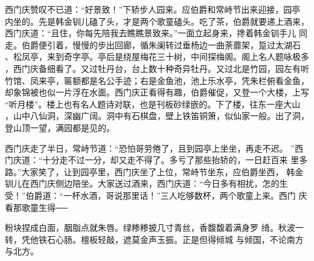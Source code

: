 西门庆赞叹不已道：“好景致！”下轿步人园来。应伯爵和常峙节出来迎接，园亭
内坐的。先是韩金钏儿磕了头，才是两个歌童磕头。吃了茶，伯爵就要递上酒来，
西门庆道：“且住，你每先陪我去瞧瞧景致来。”一面立起身来，搀着韩金钏手儿
同走。伯爵便引着，慢慢的步出回廊，循朱阑转过垂杨边一曲荼蘼架，踅过太湖石
、松凤亭，来到奇字亭。亭后是绕屋梅花三十树，中间探梅阁。阁上名人题咏极多
，西门庆备细看了。又过牡丹台，台上数十种奇异牡丹。又过北是竹园，园左有听
竹馆、凤来亭，匾额都是名公手迹；右是金鱼池，池上乐水亭，凭朱栏俯看金鱼，
却象锦被也似一片浮在水面。西门庆正看得有趣，伯爵催促，又登一个大楼，上写
“听月楼”。楼上也有名人题诗对联，也是刊板砂绿嵌的。下了楼，往东一座大山
，山中八仙洞，深幽广阔。洞中有石棋盘，壁上铁笛铜箫，似仙家一般。出了洞，
登山顶一望，满园都是见的。

西门庆走了半日，常峙节道：“恐怕哥劳倦了，且到园亭上坐坐，再走不迟。
”西门庆道：“十分走不过一分，却又走不得了。多亏了那些抬轿的，一日赶百来
里多路。”大家笑了，让到园亭里，西门庆坐了上位，常峙节坐东，应伯爵坐西，
韩金钏儿在西门庆侧边陪坐。大家送过酒来，西门庆道：“今日多有相扰，怎的生
受！”伯爵道：“一杯水酒，哥说那里话！”三人吃够数杯，两个歌童上来。西门
庆看那歌童生得──

粉块捏成白面，胭脂点就朱唇。绿糁糁披几寸青丝，香馥馥着满身罗
绮。秋波一转，凭他铁石心肠。檀板轻敲，遮莫金声玉振。正是但得倾城
与倾国，不论南方与北方。

